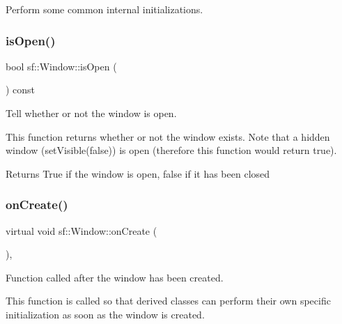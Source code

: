 Perform some common internal initializations. 

\begin{DoxyVerb}\end{DoxyVerb}
 \mbox{\label{classsf_1_1_window_ae873503db7d48157bb9cbf6129562bce}} 
\subsubsection{\texorpdfstring{isOpen()}{isOpen()}}
{\footnotesize\ttfamily bool sf\+::\+Window\+::is\+Open (\begin{DoxyParamCaption}{ }\end{DoxyParamCaption}) const}



Tell whether or not the window is open. 

This function returns whether or not the window exists. Note that a hidden window (set\+Visible(false)) is open (therefore this function would return true).

\begin{DoxyReturn}{Returns}
True if the window is open, false if it has been closed \begin{DoxyVerb}\end{DoxyVerb}
 
\end{DoxyReturn}
\mbox{\label{classsf_1_1_window_a106633b9be49b27f83d4712689b493eb}} 
\subsubsection{\texorpdfstring{onCreate()}{onCreate()}}
{\footnotesize\ttfamily virtual void sf\+::\+Window\+::on\+Create (\begin{DoxyParamCaption}{ }\end{DoxyParamCaption})\hspace{0.3cm}{\ttfamily [protected]}, {\ttfamily [virtual]}}



Function called after the window has been created. 

This function is called so that derived classes can perform their own specific initialization as soon as the window is created. \begin{DoxyVerb}\end{DoxyVerb}
 

